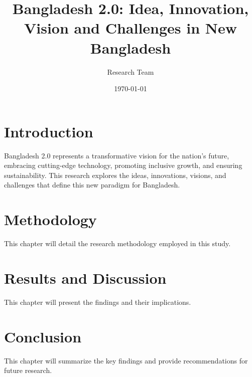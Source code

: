 \documentclass[12pt,a4paper]{report}
\title{Bangladesh 2.0: Idea, Innovation, Vision and Challenges in New Bangladesh}
\author{Research Team}
\date{\today}
\begin{document}
\maketitle

\tableofcontents
\newpage

\chapter{Introduction}
Bangladesh 2.0 represents a transformative vision for the nation's future, embracing cutting-edge technology, promoting inclusive growth, and ensuring sustainability. This research explores the ideas, innovations, visions, and challenges that define this new paradigm for Bangladesh.



\chapter{Methodology}
This chapter will detail the research methodology employed in this study.

\chapter{Results and Discussion}
This chapter will present the findings and their implications.

\chapter{Conclusion}
This chapter will summarize the key findings and provide recommendations for future research.



\end{document}
